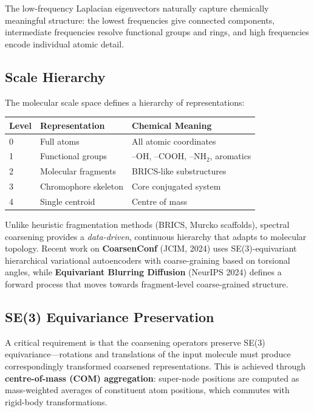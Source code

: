 \documentclass[11pt,a4paper]{article}
\begin{document}
The low-frequency Laplacian eigenvectors naturally capture chemically
meaningful structure: the lowest frequencies give connected components,
intermediate frequencies resolve functional groups and rings, and high
frequencies encode individual atomic detail.

\subsection{Scale Hierarchy}

The molecular scale space defines a hierarchy of representations:
\begin{center}
\begin{tabular}{lll}
\toprule
\textbf{Level} & \textbf{Representation} & \textbf{Chemical Meaning} \\
\midrule
0 & Full atoms & All atomic coordinates \\
1 & Functional groups & --OH, --COOH, --NH$_2$, aromatics \\
2 & Molecular fragments & BRICS-like substructures \\
3 & Chromophore skeleton & Core conjugated system \\
4 & Single centroid & Centre of mass \\
\bottomrule
\end{tabular}
\end{center}

Unlike heuristic fragmentation methods (BRICS, Murcko scaffolds), spectral
coarsening provides a \emph{data-driven}, continuous hierarchy that adapts to
molecular topology. Recent work on \textbf{CoarsenConf} (JCIM, 2024) uses
SE(3)-equivariant hierarchical variational autoencoders with coarse-graining
based on torsional angles, while \textbf{Equivariant Blurring Diffusion}
(NeurIPS 2024) defines a forward process that moves towards fragment-level
coarse-grained structure.

\subsection{SE(3) Equivariance Preservation}

A critical requirement is that the coarsening operators preserve SE(3)
equivariance---rotations and translations of the input molecule must
produce correspondingly transformed coarsened representations. This is
achieved through \textbf{centre-of-mass (COM) aggregation}: super-node
positions are computed as mass-weighted averages of constituent atom
positions, which commutes with rigid-body transformations.
\end{document}
